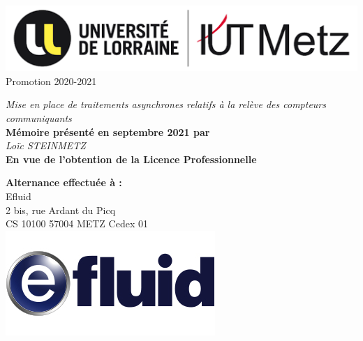 \documentclass[a4paper, 12pt]{report}
\begin{document}
\clearpage
\thispagestyle{empty}
\null
\clearpage

\begin{singlespace}
\thispagestyle{empty}
\begin{center}  
\begin{multicols}{2}
  \flushleft
  \null
  \includegraphics[width=\columnwidth]{../res/logo-iut.png}
  \flushright
  \null
  \vspace{0.3cm}
  \large{Promotion 2020-2021}
\end{multicols}
\vspace{2cm}
\LARGE{\textit{Mise en place de traitements asynchrones relatifs à la relève des compteurs communiquants}}\\
\vspace{2cm}
\large{\textbf{Mémoire présenté en septembre 2021 par}}\\
\vspace{0.5cm}
\Large{\textit{Loïc STEINMETZ}}\\
\vspace{2cm}
\large{\textbf{En vue de l'obtention de la Licence Professionnelle}}\\
\vspace{0.5cm}
\vspace{2.8cm}
\begin{multicols}{2}
  \flushleft
  \null
  \textbf{Alternance effectuée à :}\\
  Efluid\\
  2 bis, rue Ardant du Picq\\
  CS 10100 57004 METZ Cedex 01\\
  \flushright
  \null
  \includegraphics[width=.6\columnwidth]{../res/logo-efluid.jpg}
\end{multicols}
\end{center}
\end{singlespace}
\end{document}
